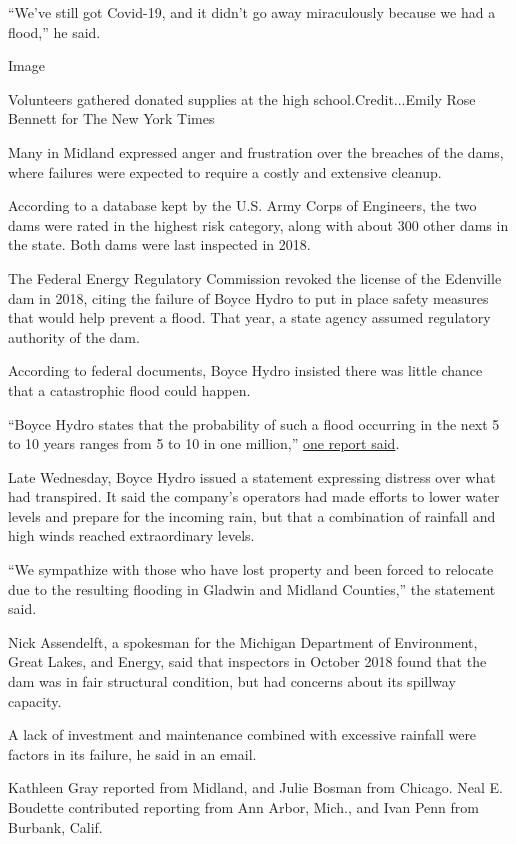 ``We've still got Covid-19, and it didn't go away miraculously because
we had a flood,'' he said.

Image

Volunteers gathered donated supplies at the high school.Credit...Emily
Rose Bennett for The New York Times

Many in Midland expressed anger and frustration over the breaches of the
dams, where failures were expected to require a costly and extensive
cleanup.

According to a database kept by the U.S. Army Corps of Engineers, the
two dams were rated in the highest risk category, along with about 300
other dams in the state. Both dams were last inspected in 2018.

The Federal Energy Regulatory Commission revoked the license of the
Edenville dam in 2018, citing the failure of Boyce Hydro to put in place
safety measures that would help prevent a flood. That year, a state
agency assumed regulatory authority of the dam.

According to federal documents, Boyce Hydro insisted there was little
chance that a catastrophic flood could happen.

``Boyce Hydro states that the probability of such a flood occurring in
the next 5 to 10 years ranges from 5 to 10 in one million,''
\href{https://ferc.gov/whats-new/comm-meet/2018/021518/H-3.pdf}{one
report said}.

Late Wednesday, Boyce Hydro issued a statement expressing distress over
what had transpired. It said the company's operators had made efforts to
lower water levels and prepare for the incoming rain, but that a
combination of rainfall and high winds reached extraordinary levels.

``We sympathize with those who have lost property and been forced to
relocate due to the resulting flooding in Gladwin and Midland
Counties,'' the statement said.

Nick Assendelft, a spokesman for the Michigan Department of Environment,
Great Lakes, and Energy, said that inspectors in October 2018 found that
the dam was in fair structural condition, but had concerns about its
spillway capacity.

A lack of investment and maintenance combined with excessive rainfall
were factors in its failure, he said in an email.

Kathleen Gray reported from Midland, and Julie Bosman from Chicago. Neal
E. Boudette contributed reporting from Ann Arbor, Mich., and Ivan Penn
from Burbank, Calif.

